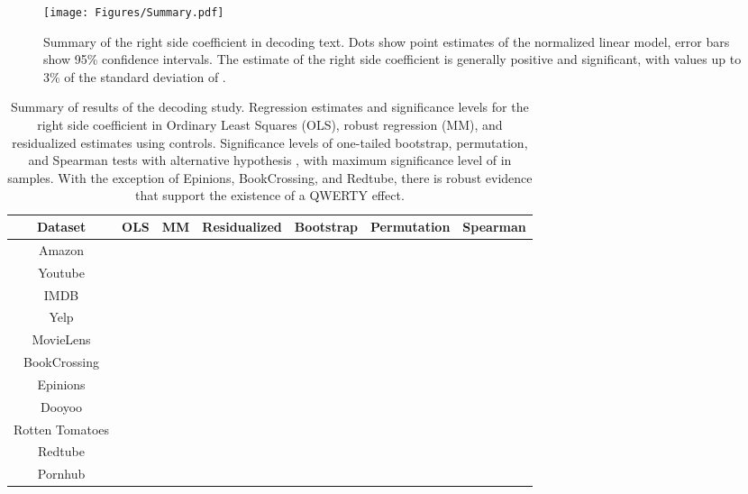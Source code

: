 \documentclass[letterpaper]{sig-alternate-2013}
\begin{document}
\begin{figure}[t]
\centering
\texttt{[image: Figures/Summary.pdf]}\\
\caption{Summary of the right side coefficient  in decoding text. Dots show point estimates of the normalized linear model, error bars show 95\% confidence intervals.  The estimate of the right side coefficient is generally positive and significant, with values up to 3\% of the standard deviation of . \label{fig:Summary}}
\end{figure}


\begin{table*}[bp]
\begin{center}
    \begin{tabular}{c|cc|cc|cc|c|c|c}

Dataset 		& \multicolumn{2}{|c|}{OLS }  & \multicolumn{2}{|c|}{MM }  & \multicolumn{2}{|c|}{Residualized  }  & Bootstrap & Permutation & Spearman \\
\hline
Amazon  		&  &   &  &   &  &  &  &  &  \\
Youtube 		&  &   &  &   &  &  &  &  &  \\
IMDB 			&  &   &  &   &  &  &  &  &  \\
Yelp 			&  &   &  &   &  &  &  &  &  \\
MovieLens		&  &   &  &    &  &  &  &  &  \\
BookCrossing	&  &   	&  &     &  &   &  &  &  \\	
Epinions		&  &   &   &     &  &    &  &  &  \\
Dooyoo			&  &   &  &   &  &  &  &  &  \\
{\small Rotten Tomatoes} &  &   &  &   &  &  &  &  &  \\
Redtube			&  &   &  &   &  &  &  &  &  \\
Pornhub			&  &   &  &   &  &  &  &  &  \\

\end{tabular}
\end{center}

\caption{Summary of results of the decoding study. Regression estimates and
significance levels for the right side coefficient  in Ordinary Least
Squares (OLS), robust regression (MM), and residualized estimates using
controls. Significance levels of one-tailed bootstrap, permutation, and Spearman tests with alternative hypothesis , with maximum significance
level of  in  samples. With the exception of Epinions,
BookCrossing, and Redtube, there is robust evidence that support the existence
of a QWERTY effect.   \label{tab:Decoding}}
\end{table*}
\end{document}
